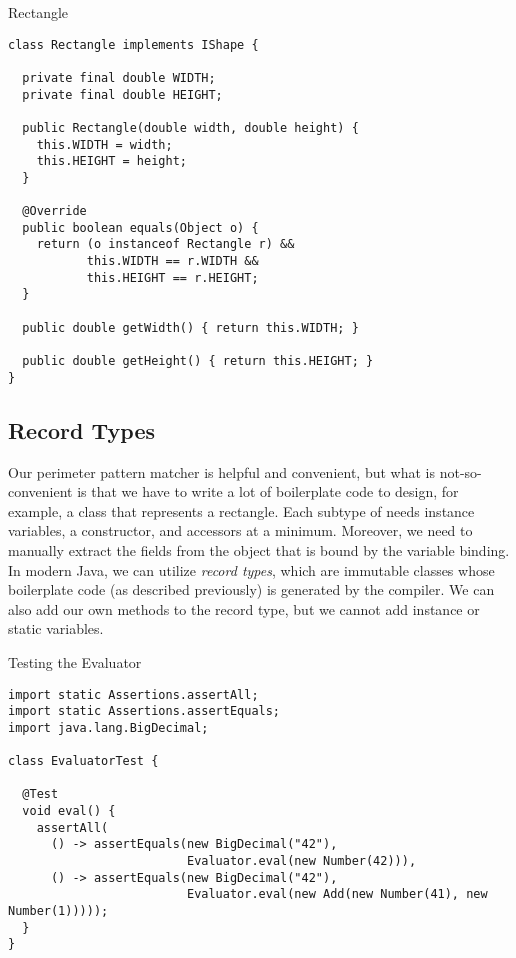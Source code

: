 \begin{cl}[]{Rectangle}
\begin{lstlisting}[language=MyJava]
class Rectangle implements IShape {

  private final double WIDTH;
  private final double HEIGHT;

  public Rectangle(double width, double height) {
    this.WIDTH = width;
    this.HEIGHT = height;
  }

  @Override
  public boolean equals(Object o) {
    return (o instanceof Rectangle r) &&
           this.WIDTH == r.WIDTH &&
           this.HEIGHT == r.HEIGHT;
  }

  public double getWidth() { return this.WIDTH; }

  public double getHeight() { return this.HEIGHT; }
}
\end{lstlisting}
\end{cl}


\subsection{Record Types}

Our perimeter pattern matcher is helpful and convenient, but what is not-so-convenient is that we have to write a lot of boilerplate code to design, for example, a class that represents a rectangle. Each subtype of  needs instance variables, a constructor, and accessors at a minimum. Moreover, we need to manually extract the fields from the object that is bound by the variable binding. In modern Java, we can utilize \textit{record types}, which are immutable classes whose boilerplate code (as described previously) is generated by the compiler. We can also add our own methods to the record type, but we cannot add instance or static variables.


\begin{cl}[]{Testing the Evaluator}
\begin{lstlisting}[language=MyJava]
import static Assertions.assertAll;
import static Assertions.assertEquals;
import java.lang.BigDecimal;

class EvaluatorTest {

  @Test
  void eval() {
    assertAll(
      () -> assertEquals(new BigDecimal("42"),
                         Evaluator.eval(new Number(42))),
      () -> assertEquals(new BigDecimal("42"),
                         Evaluator.eval(new Add(new Number(41), new Number(1)))));
  }
}
\end{lstlisting}
\end{cl}

